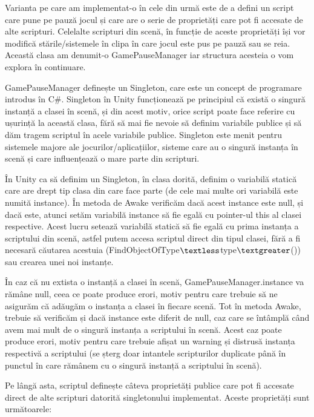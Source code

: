 \documentclass[12pt, a4paper]{article}
\begin{document}
	Varianta pe care am implementat-o în cele din urmă este de a defini un script care pune pe pauză jocul și care are o serie de proprietăți care pot fi accesate de alte scripturi. Celelalte scripturi din scenă, în funcție de aceste proprietăți își vor modifică stările/sistemele în clipa în care jocul este pus pe pauză sau se reia. Această clasa am denumit-o GamePauseManager iar structura acesteia o vom explora în continuare.
	\newline
	
	GamePauseManager definește un Singleton, care este un concept de programare introdus în C\#. Singleton în Unity funcționează pe principiul că există o singură instanță a clasei în scenă, și din acest motiv, orice script poate face referire cu ușurință la această clasa, fără să mai fie nevoie să definim variabile publice și să dăm tragem scriptul în acele variabile publice. Singleton este menit pentru sistemele majore ale jocurilor/aplicațiilor, sisteme care au o singură instanța în scenă și care influențează o mare parte din scripturi. 
	\newline
	
	În Unity ca să definim un Singleton, în clasa dorită, definim o variabilă statică care are drept tip clasa din care face parte (de cele mai multe ori variabilă este numită instance). În metoda de Awake verificăm dacă acest instance este null, și dacă este, atunci setăm variabilă instance să fie egală cu pointer-ul this al clasei respective. Acest lucru setează variabilă statică să fie egală cu prima instanța a scriptului din scenă, astfel putem accesa scriptul direct din tipul clasei, fără a fi necesară căutarea acestuia (FindObjectOfType$\textless$type$\textgreater$()) sau crearea unei noi instanțe. 
	\newline
	
	În caz că nu extista o instanță a clasei în scenă, GamePauseManager.instance va rămâne null, ceea ce poate produce erori, motiv pentru care trebuie să ne asigurăm că adăugăm o instanța a clasei în fiecare scenă. Tot în metoda Awake, trebuie să verificăm și dacă instance este diferit de null, caz care se întâmplă când avem mai mult de o singură instanța a scriptului în scenă. Acest caz poate produce erori, motiv pentru care trebuie afișat un warning și distrusă instanța respectivă a scriptului (se șterg doar intantele scripturilor duplicate până în punctul în care rămânem cu o singură instanță a scriptului în scenă).
	\newline
	
	Pe lângă asta, scriptul definește câteva proprietăți publice care pot fi accesate direct de alte scripturi datorită singletonului implementat. Aceste proprietăți sunt următoarele:
	
\end{document}
